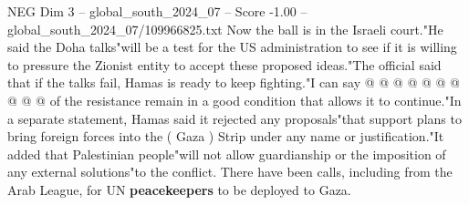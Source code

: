 \begin{textsample}{NEG Dim 3 – global\_south\_2024\_07 – Score -1.00 – global\_south\_2024\_07/109966825.txt}
Now the ball is in the Israeli court."He said the Doha talks"will be a test for the US administration to see if it is willing to pressure the Zionist entity to accept these proposed ideas."The official said that if the talks fail, Hamas is ready to keep fighting."I can say @ @ @ @ @ @ @ @ @ @ of the resistance remain in a good condition that allows it to continue."In a separate statement, Hamas said it rejected any proposals"that support plans to bring foreign forces into the ( Gaza ) Strip under any name or justification."It added that Palestinian people"will not allow guardianship or the imposition of any external solutions"to the conflict.
There have been calls, including from the Arab League, for UN \textbf{peacekeepers} to be deployed to Gaza.

\end{textsample}
